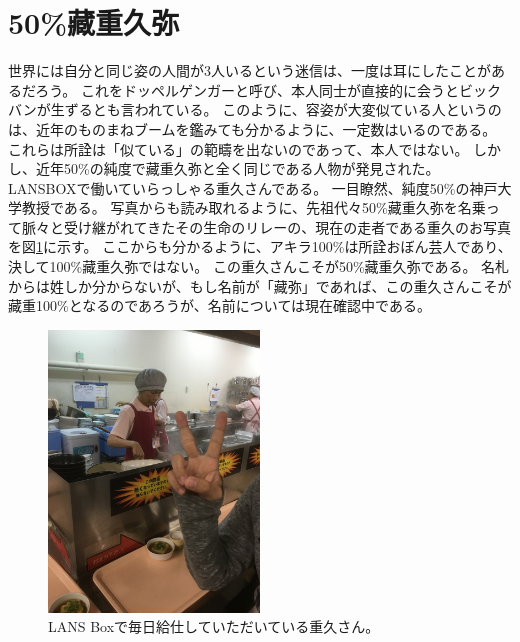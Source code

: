 \section{50\%藏重久弥}
世界には自分と同じ姿の人間が3人いるという迷信は、一度は耳にしたことがあるだろう。
これをドッペルゲンガーと呼び、本人同士が直接的に会うとビックバンが生ずるとも言われている。
このように、容姿が大変似ている人というのは、近年のものまねブームを鑑みても分かるように、一定数はいるのである。
これらは所詮は「似ている」の範疇を出ないのであって、本人ではない。
しかし、近年50\%の純度で藏重久弥と全く同じである人物が発見された。
LANSBOXで働いていらっしゃる重久さんである。
一目瞭然、純度50\%の神戸大学教授である。
写真からも読み取れるように、先祖代々50\%藏重久弥を名乗って脈々と受け継がれてきたその生命のリレーの、現在の走者である重久のお写真を図\ref{Fig:Shigehisa}に示す。
ここからも分かるように、アキラ100\%は所詮おぼん芸人であり、決して100\%藏重久弥ではない。
この重久さんこそが50\%藏重久弥である。
名札からは姓しか分からないが、もし名前が「藏弥」であれば、この重久さんこそが藏重100\%となるのであろうが、名前については現在確認中である。
\begin{figure}[h]
\centering
\includegraphics[width=0.5\textwidth]{./section/Shokuji/figures/Shigehisa.jpg}
\caption{LANS Boxで毎日給仕していただいている重久さん。}
\label{Fig:Shigehisa}
\end{figure}



